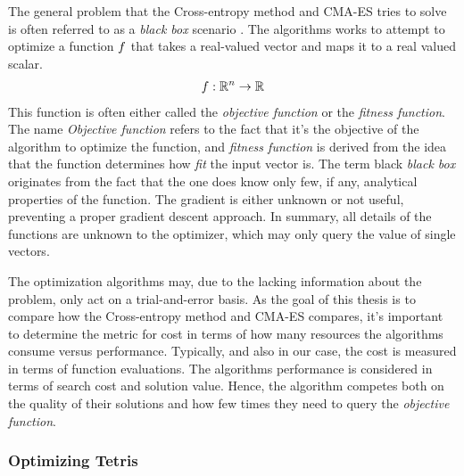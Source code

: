 The general problem that the Cross-entropy method and CMA-ES 
tries to solve is often referred  to as a \textit{black box}
scenario \citep{hansen2011}. The algorithms works to 
attempt to optimize a function $f$ that takes
a real-valued vector and maps it to a real valued scalar.
\begin{align*}
f : \mathbb{R}^{n} \rightarrow \mathbb{R}
\end{align*}
This function is often either called the \textit{objective function}
or the \textit{fitness function}. The name \textit{Objective function}
refers to the fact that it's the objective of the algorithm to optimize
the function, and \textit{fitness function} is derived from the
idea that the function determines how \textit{fit} the input vector
is. The term black \textit{black box} originates from the fact that 
the one does know only few, if any, analytical properties of the function.
The gradient is either unknown or not useful, preventing a 
proper gradient 
descent approach. In summary, all details of the functions are unknown to 
the optimizer, which may only query the value of single vectors.
\begin{figure}[H]
\centering
{}
\end{figure}
The optimization algorithms may, due to the lacking information about the
problem, only act on a trial-and-error basis. As the goal of this
thesis is to compare how the Cross-entropy method and CMA-ES compares, 
it's important to determine the metric for cost in terms of 
how many resources the algorithms consume versus performance.
Typically, and also in our case, the cost is measured in terms 
of function evaluations. The algorithms performance is considered 
in terms of search cost and solution value. Hence, the algorithm 
competes both on the quality of their solutions and how few times
they need to query the \textit{objective function}.


\subsubsection{Optimizing Tetris}


